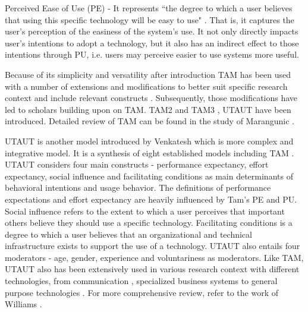 \documentclass[a4paper,12pt]{article}
\newcommand{\citeyearonly}[1]{\citeyearpar{#1}}
\begin{document}
Perceived Ease of Use (PE) - It represents ``the degree to which a user believes that using this specific technology will be easy to use" \citep{davis1985technology}. That is, it captures the user's perception of the easiness of the system's use. It not only directly impacts user's intentions to adopt a technology, but it also has an indirect effect to those intentions through PU, i.e. users may perceive easier to use systems more useful.  

Because of its simplicity and versatility after introduction TAM has been used with a number of extensions and modifications to better suit specific research context and include relevant constructs \citep{amoako2004extension, burton2006mediationextension, featherman2003predictingextension}. Subsequently, those modifications have led to scholars building upon on TAM. TAM2 \citep{venkateshDeterminantsPerceivedEase2000} and TAM3 \citep{venkateshTechnologyAcceptanceModel2008}, UTAUT \citep{venkatesh2003utaut} have been introduced. Detailed review of TAM can be found in the study of Marangunic \citeyearonly{marangunic2015technology}.

UTAUT is another model introduced by Venkatesh which is more complex and integrative model. It is a synthesis of eight established models including TAM \citep{venkatesh2003utaut}. UTAUT considers four main constructs - performance expectancy, effort expectancy, social influence and facilitating conditions as main determinants of behavioral intentions and usage behavior. The definitions of performance expectations and effort expectancy are heavily influenced by Tam's PE and PU. Social influence refers to the extent to which a user perceives that important others believe they should use a specific technology. Facilitating conditions is a degree to which a user believes that an organizational and technical infrastructure exists to support the use of a technology. UTAUT also entails four moderators - age, gender, experience and voluntariness as moderators. Like TAM, UTAUT also has been extensively used in various research context with different technologies, from communication \citep{wu2007empirical}, specialized business systems \citep{kijsanayotin2009factors} to general purpose technologies \citep{abu2010internet}. For more comprehensive review, refer to the work of Williams \citeyearonly{williams2015unified}. 
\end{document}
